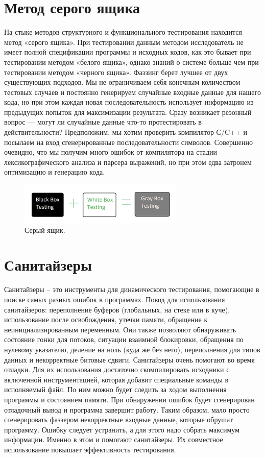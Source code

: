 \documentclass[areasetadvanced]{scrartcl}
\begin{document}
\section{Метод серого ящика}
На стыке методов структурного и функционального тестирования находится метод «серого
ящика». При тестировании данным методом исследователь не имеет полной спецификации
программы и исходных кодов, как это бывает при тестировании методом «белого ящика», однако
знаний о системе больше чем при тестировании методом «черного ящика».
Фаззинг берет лучшее от двух существующих подходов. Мы не ограничиваем себя конечным
количеством тестовых случаев и постоянно генерируем случайные входные данные для нашего
кода, но при этом каждая новая последовательность использует информацию из предыдущих
попыток для максимизации результата.
Сразу возникает резонный вопрос — могут ли случайные данные что-то протестировать в
действительности? Предположим, мы хотим проверить компилятор С/C++ и посылаем на вход
сгенерированные последовательности символов. Совершенно очевидно, что мы получим много
ошибок от компилятора на стадии лексикографического анализа и парсера выражений, но при
этом едва затронем оптимизацию и генерацию кода.
\begin{figure}[H]
    \begin{center}
      \centering
      \includegraphics[width=0.7\textwidth]{image.png}
      \caption{Серый ящик.}
      \label{fig:syntdiag}
    \end{center}
  \end{figure}

\newpage
\section{Санитайзеры}
Санитайзеры – это инструменты для динамического тестирования, помогающие в поиске самых
разных ошибок в программах.
Повод для использования санитайзеров: переполнение буферов (глобальных, на стеке или в куче),
использование после освобождения, утечки памяти, обращение к неинициализированным
переменным.
Они также позволяют обнаруживать состояние гонки для потоков, ситуации взаимной
блокировки, обращения по нулевому указателю, деление на ноль (куда же без него),
переполнения для типов данных и некорректные битовые сдвиги.
Санитайзеры очень помогают во время отладки. Для их использования достаточно
скомпилировать исходники с включенной инструментацией, которая добавит специальные
команды в исполняемый файл. По ним можно будет следить за ходом выполнения программы и
состоянием памяти. При обнаружении ошибок будет сгенерирован отладочный вывод и
программа завершит работу.
Таким образом, мало просто сгенерировать фаззером некорректные входные данные, которые
обрушат программу. Ошибку следует устранить, а для этого надо собрать максимум информации.
Именно в этом и помогают санитайзеры. Их совместное использование повышает эффективность
тестирования.
\newpage
\end{document}
